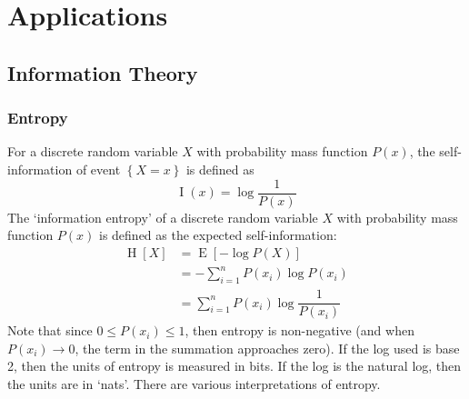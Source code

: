 \documentclass[11pt]{report} %
\begin{document}
\part{Applications}

\chapter{Information Theory}

\section{Entropy}

For a discrete random variable $X$ with probability mass function $P\left(x\right)$, the self-information of event $\left\{X = x\right\}$ is defined as
\begin{equation}
\operatorname{I}\left(x\right) = \log\dfrac{1}{P\left(x\right)}
\end{equation}
The `information entropy' of a discrete random variable $X$ with probability mass function $P\left(x\right)$ is defined as the expected self-information:
\begin{align}
\operatorname{H}\left[X\right] &= \operatorname{E}\left[-\log P\left(X\right)\right] \\
&= -\sum_{i = 1}^{n}P\left(x_{i}\right)\log P\left(x_{i}\right) \\
&= \sum_{i = 1}^{n}P\left(x_{i}\right)\log \dfrac{1}{P\left(x_{i}\right)}
\end{align}
Note that since $0 \leq P\left(x_{i}\right) \leq 1$, then entropy is non-negative (and when $P\left(x_{i}\right) \rightarrow 0$, the term in the summation approaches zero). If the log used is base 2, then the units of entropy is measured in bits. If the log is the natural log, then the units are in `nats'. There are various interpretations of entropy.
\end{document}
